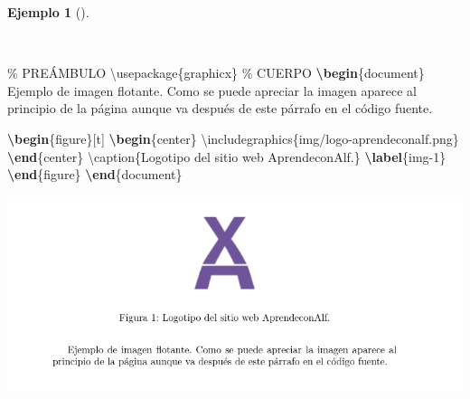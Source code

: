 \documentclass[
  a4paper,
]{scrreport}
\newenvironment{Shaded}{\begin{snugshade}}{\end{snugshade}}
\newcommand{\BuiltInTok}[1]{\textcolor[rgb]{0.00,0.23,0.31}{#1}}
\newcommand{\CommentTok}[1]{\textcolor[rgb]{0.37,0.37,0.37}{#1}}
\newcommand{\ExtensionTok}[1]{\textcolor[rgb]{0.00,0.23,0.31}{#1}}
\newcommand{\FunctionTok}[1]{\textcolor[rgb]{0.28,0.35,0.67}{#1}}
\newcommand{\KeywordTok}[1]{\textcolor[rgb]{0.00,0.23,0.31}{\textbf{#1}}}
\newcommand{\NormalTok}[1]{\textcolor[rgb]{0.00,0.23,0.31}{#1}}
\theoremstyle{definition}
\newtheorem{example}{Ejemplo}[chapter]
\theoremstyle{remark}
\begin{document}
\begin{example}[]\protect\hypertarget{exm-figuras-flotantes}{}\label{exm-figuras-flotantes}

~

\begin{Shaded}
\begin{Highlighting}[]
\CommentTok{\% PREÁMBULO}
\BuiltInTok{\textbackslash{}usepackage}\NormalTok{\{}\ExtensionTok{graphicx}\NormalTok{\}}
\CommentTok{\% CUERPO}
\KeywordTok{\textbackslash{}begin}\NormalTok{\{}\ExtensionTok{document}\NormalTok{\}}
\NormalTok{Ejemplo de imagen flotante. Como se puede apreciar la imagen aparece al }
\NormalTok{principio de la página aunque va después de este párrafo en el código }
\NormalTok{fuente.}

\KeywordTok{\textbackslash{}begin}\NormalTok{\{}\ExtensionTok{figure}\NormalTok{\}[t]}
\KeywordTok{\textbackslash{}begin}\NormalTok{\{}\ExtensionTok{center}\NormalTok{\}}
\BuiltInTok{\textbackslash{}includegraphics}\NormalTok{\{}\ExtensionTok{img/logo{-}aprendeconalf.png}\NormalTok{\}}
\KeywordTok{\textbackslash{}end}\NormalTok{\{}\ExtensionTok{center}\NormalTok{\}}
\FunctionTok{\textbackslash{}caption}\NormalTok{\{Logotipo del sitio web AprendeconAlf.\}}
\KeywordTok{\textbackslash{}label}\NormalTok{\{}\ExtensionTok{img{-}1}\NormalTok{\}}
\KeywordTok{\textbackslash{}end}\NormalTok{\{}\ExtensionTok{figure}\NormalTok{\}}
\KeywordTok{\textbackslash{}end}\NormalTok{\{}\ExtensionTok{document}\NormalTok{\}}
\end{Highlighting}
\end{Shaded}

\begin{tcolorbox}[enhanced jigsaw, colframe=quarto-callout-note-color-frame, opacityback=0, title={Salida}, bottomrule=.15mm, left=2mm, coltitle=black, arc=.35mm, leftrule=.75mm, colback=white, rightrule=.15mm, colbacktitle=quarto-callout-note-color!10!white, toprule=.15mm, breakable, opacitybacktitle=0.6, bottomtitle=1mm, toptitle=1mm, titlerule=0mm]

\includegraphics{img/entornos-flotantes/figura-flotante.png}

\end{tcolorbox}

\end{example}
\end{document}
